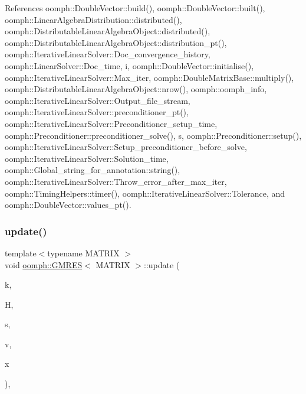 References oomph\+::\+Double\+Vector\+::build(), oomph\+::\+Double\+Vector\+::built(), oomph\+::\+Linear\+Algebra\+Distribution\+::distributed(), oomph\+::\+Distributable\+Linear\+Algebra\+Object\+::distributed(), oomph\+::\+Distributable\+Linear\+Algebra\+Object\+::distribution\+\_\+pt(), oomph\+::\+Iterative\+Linear\+Solver\+::\+Doc\+\_\+convergence\+\_\+history, oomph\+::\+Linear\+Solver\+::\+Doc\+\_\+time, i, oomph\+::\+Double\+Vector\+::initialise(), oomph\+::\+Iterative\+Linear\+Solver\+::\+Max\+\_\+iter, oomph\+::\+Double\+Matrix\+Base\+::multiply(), oomph\+::\+Distributable\+Linear\+Algebra\+Object\+::nrow(), oomph\+::oomph\+\_\+info, oomph\+::\+Iterative\+Linear\+Solver\+::\+Output\+\_\+file\+\_\+stream, oomph\+::\+Iterative\+Linear\+Solver\+::preconditioner\+\_\+pt(), oomph\+::\+Iterative\+Linear\+Solver\+::\+Preconditioner\+\_\+setup\+\_\+time, oomph\+::\+Preconditioner\+::preconditioner\+\_\+solve(), s, oomph\+::\+Preconditioner\+::setup(), oomph\+::\+Iterative\+Linear\+Solver\+::\+Setup\+\_\+preconditioner\+\_\+before\+\_\+solve, oomph\+::\+Iterative\+Linear\+Solver\+::\+Solution\+\_\+time, oomph\+::\+Global\+\_\+string\+\_\+for\+\_\+annotation\+::string(), oomph\+::\+Iterative\+Linear\+Solver\+::\+Throw\+\_\+error\+\_\+after\+\_\+max\+\_\+iter, oomph\+::\+Timing\+Helpers\+::timer(), oomph\+::\+Iterative\+Linear\+Solver\+::\+Tolerance, and oomph\+::\+Double\+Vector\+::values\+\_\+pt().

\mbox{\label{classoomph_1_1GMRES_af9ae9481736b87b8371e44c207a57059}} 
\subsubsection{\texorpdfstring{update()}{update()}}
{\footnotesize\ttfamily template$<$typename M\+A\+T\+R\+IX $>$ \\
void \hyperlink{classoomph_1_1GMRES}{oomph\+::\+G\+M\+R\+ES}$<$ M\+A\+T\+R\+IX $>$\+::update (\begin{DoxyParamCaption}\item[{const unsigned \&}]{k,  }\item[{const \hyperlink{classoomph_1_1Vector}{Vector}$<$ \hyperlink{classoomph_1_1Vector}{Vector}$<$ double $>$ $>$ \&}]{H,  }\item[{const \hyperlink{classoomph_1_1Vector}{Vector}$<$ double $>$ \&}]{s,  }\item[{const \hyperlink{classoomph_1_1Vector}{Vector}$<$ \hyperlink{classoomph_1_1DoubleVector}{Double\+Vector} $>$ \&}]{v,  }\item[{\hyperlink{classoomph_1_1DoubleVector}{Double\+Vector} \&}]{x }\end{DoxyParamCaption})\hspace{0.3cm}{\ttfamily [inline]}, {\ttfamily [private]}}



